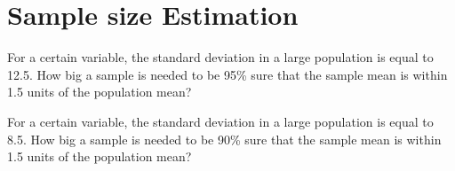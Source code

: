 
\section{Sample size Estimation}
For a certain variable, the standard deviation in a large population is equal to 12.5.
How big a sample is needed to be 95\% sure that the sample mean is within 1.5 units of the population mean?


For a certain variable, the standard deviation in a large population is equal to 8.5.
How big a sample is needed to be 90\% sure that the sample mean is within 1.5
units of the population mean?


\newpage
